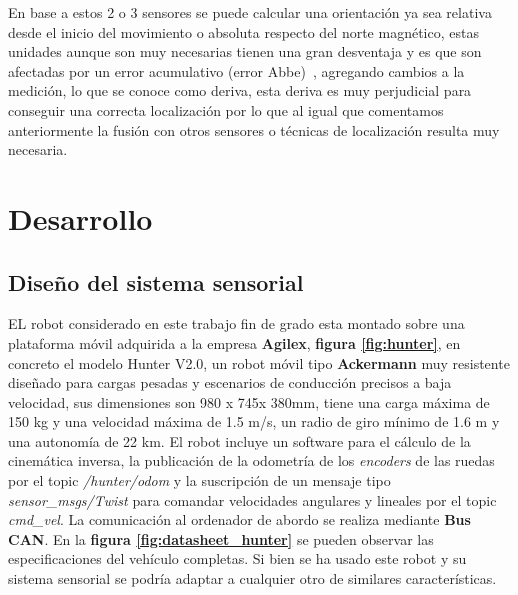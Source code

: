 En base a estos 2 o 3 sensores se puede calcular una orientación ya sea relativa desde el inicio del movimiento o absoluta respecto del norte 
magnético, estas unidades aunque son muy necesarias tienen una gran desventaja y es que son afectadas por un error acumulativo 
(error Abbe)~\cite{errorAbbe23}, agregando cambios a la medición, lo que se conoce como deriva, esta deriva es muy perjudicial para conseguir una 
correcta localización por lo que al igual que comentamos anteriormente la fusión con otros sensores o técnicas de localización resulta muy necesaria.
\cleardoublepage
\titlespacing*{\chapter}{0pt}{-50pt}{40pt} %

\chapter{Desarrollo}

\section{Diseño del sistema sensorial}

EL robot considerado en este trabajo fin de grado esta montado sobre una plataforma móvil adquirida a la empresa \textbf{Agilex}, \textbf{figura \ref{fig:hunter}}, en concreto el 
modelo Hunter V2.0, un robot móvil tipo \textbf{Ackermann} muy resistente diseñado para cargas pesadas y escenarios de conducción precisos 
a baja velocidad, sus dimensiones son 980 x 745x 380mm, tiene una carga máxima de 150 kg y una velocidad máxima de 1.5 m/s, un radio 
de giro mínimo de 1.6 m y una autonomía de 22 km. El robot incluye un software para el cálculo de la cinemática inversa, la publicación de 
la odometría de los \textit{encoders} de las ruedas por el topic \textit{/hunter/odom} y la suscripción de un mensaje tipo \textit{sensor\_msgs/Twist} 
para comandar velocidades angulares y lineales por el topic \textit{cmd\_vel}. La comunicación al ordenador de abordo se realiza mediante \textbf{Bus CAN}. 
En la \textbf{figura \ref{fig:datasheet_hunter}} se pueden observar las especificaciones del vehículo completas. Si bien se ha usado este robot y su sistema sensorial 
se podría adaptar a cualquier otro de similares características.


